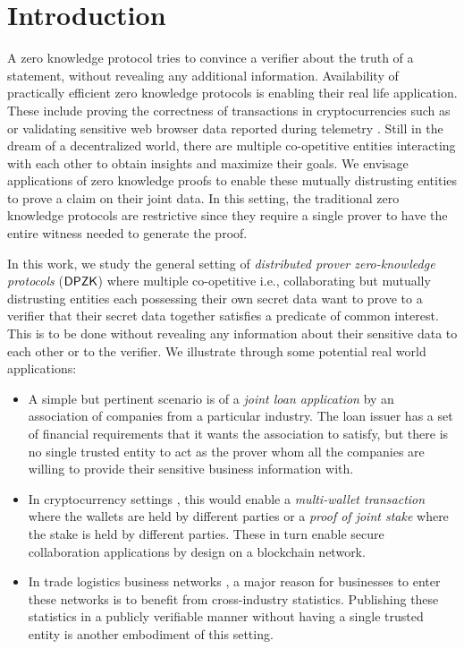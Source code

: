 \section{Introduction} \label{sec:intro}
A zero knowledge protocol tries to convince a verifier about the truth of a
statement, without revealing any additional information. Availability of
practically efficient zero knowledge protocols is enabling their real life
application. These include proving the correctness of
transactions in cryptocurrencies such as \cite{zerocash} or validating sensitive web browser data reported during
telemetry \cite{MozillaPrio}. Still in the dream of a decentralized world, there are
multiple co-opetitive entities interacting with each other to obtain insights
and maximize their goals. We envisage applications of zero knowledge
proofs to enable these mutually
distrusting entities to prove a claim on their joint data. In this setting, the 
traditional zero knowledge protocols are restrictive since they require
a single prover to have the entire witness needed to generate the proof. 

In this work, we study the general setting of \textit{distributed prover
zero-knowledge protocols} ($\mathsf{DPZK}$) where multiple co-opetitive i.e.,
collaborating but mutually distrusting entities each possessing their own secret
data want to prove to a verifier that their secret data together satisfies a
predicate of common interest. This is to be done without revealing any information
about their sensitive data to each other or to the verifier. We illustrate
through some potential real world applications:
\begin{itemize}
\item A simple but pertinent scenario is of a \textit{joint loan application} by an association of companies from a particular industry. The loan issuer has a set of financial requirements that it wants the association to satisfy, but there is no single trusted entity to act as the prover whom all the companies are willing to provide their sensitive business information with.
\item In cryptocurrency settings \cite{bitcoin, ethereum, zerocash}, this would enable a \textit{multi-wallet transaction} where the wallets are held by different parties or a \textit{proof of joint stake} where the stake is held by different parties. These in turn enable secure collaboration applications by design on a blockchain network. %
\item In trade logistics business networks \cite{scbn, e2open, tradelens}, a major reason for businesses to enter these networks is to benefit from cross-industry statistics. Publishing these statistics in a publicly verifiable manner without having a single trusted entity is another embodiment of this setting.
\end{itemize}

